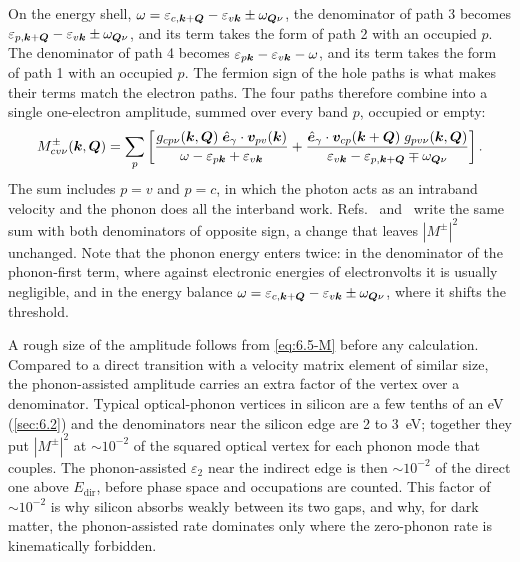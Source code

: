 On the energy shell, $\omega = \varepsilon_{c,\bm{k}+\bm{Q}} - \varepsilon_{v\bm{k}} \pm \omega_{\bm{Q}\nu}$, the denominator of path 3 becomes $\varepsilon_{p,\bm{k}+\bm{Q}} - \varepsilon_{v\bm{k}} \pm \omega_{\bm{Q}\nu}$, and its term takes the form of path 2 with an occupied $p$. The denominator of path 4 becomes $\varepsilon_{p\bm{k}} - \varepsilon_{v\bm{k}} - \omega$, and its term takes the form of path 1 with an occupied $p$. The fermion sign of the hole paths is what makes their terms match the electron paths. The four paths therefore combine into a single one-electron amplitude, summed over every band $p$, occupied or empty:
\begin{equation}
  M^{\pm}_{cv\nu}(\bm{k},\bm{Q}) = \sum_p\left[\frac{g_{cp\nu}(\bm{k},\bm{Q})\;\hat{\bm{e}}_\gamma\cdot\bm{v}_{pv}(\bm{k})}{\omega - \varepsilon_{p\bm{k}} + \varepsilon_{v\bm{k}}} + \frac{\hat{\bm{e}}_\gamma\cdot\bm{v}_{cp}(\bm{k}+\bm{Q})\;g_{pv\nu}(\bm{k},\bm{Q})}{\varepsilon_{v\bm{k}} - \varepsilon_{p,\bm{k}+\bm{Q}} \mp \omega_{\bm{Q}\nu}}\right] .
  \label{eq:6.5-M}
\end{equation}
The sum includes $p = v$ and $p = c$, in which the photon acts as an intraband velocity and the phonon does all the interband work. Refs.~\cite[Eq.~(200)]{giustino2017electron} and~\cite[Eqs.~(2) and~(3)]{noffsinger2012phonon} write the same sum with both denominators of opposite sign, a change that leaves $|M^\pm|^2$ unchanged. Note that the phonon energy enters twice: in the denominator of the phonon-first term, where against electronic energies of electronvolts it is usually negligible, and in the energy balance $\omega = \varepsilon_{c,\bm{k}+\bm{Q}} - \varepsilon_{v\bm{k}} \pm \omega_{\bm{Q}\nu}$, where it shifts the threshold.

A rough size of the amplitude follows from \cref{eq:6.5-M} before any calculation. Compared to a direct transition with a velocity matrix element of similar size, the phonon-assisted amplitude carries an extra factor of the vertex over a denominator. Typical optical-phonon vertices in silicon are a few tenths of an eV (\cref{sec:6.2}) and the denominators near the silicon edge are 2 to \SI{3}{eV}; together they put $|M^\pm|^2$ at $\sim10^{-2}$ of the squared optical vertex for each phonon mode that couples. The phonon-assisted $\varepsilon_2$ near the indirect edge is then $\sim10^{-2}$ of the direct one above $E_{\mathrm{dir}}$, before phase space and occupations are counted. This factor of $\sim10^{-2}$ is why silicon absorbs weakly between its two gaps, and why, for dark matter, the phonon-assisted rate dominates only where the zero-phonon rate is kinematically forbidden.

